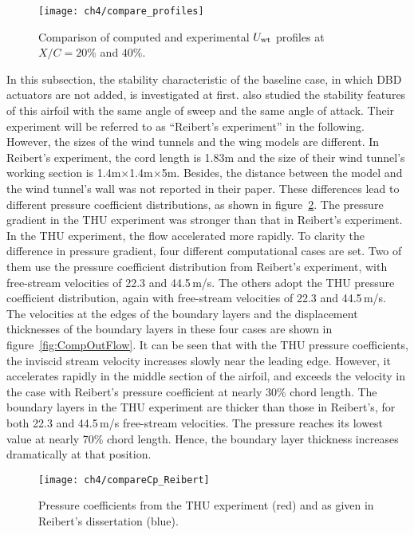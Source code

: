 \begin{figure}
\centering
  \texttt{[image: ch4/compare\_profiles]}
\caption{Comparison of computed and experimental $U_{\rm{wt}}$ profiles at  $X/C= 20\%$ and $40\%$.}
\label{f:compare_profiles}
\end{figure}
In this subsection, the stability characteristic of the baseline case, in which DBD actuators are not added, is investigated at first.  \cite{Reiberit1996} also studied the stability features of this airfoil with the same  angle of sweep and the same angle of attack. Their experiment will be referred to as ``Reibert's experiment'' in the following. However, the sizes of the wind tunnels and the wing models are  different. In Reibert's experiment, the cord length is 1.83m and the size of their wind tunnel's working section is 1.4m$\times$1.4m$\times$5m. Besides, the distance between the model and the wind tunnel's wall was not reported in their paper. These differences lead to different pressure coefficient distributions, as shown in figure~\ref{f:CpCompare}. The pressure gradient in the THU experiment was stronger than that in Reibert's experiment. In the THU experiment, the flow accelerated more rapidly. To clarity the difference in pressure gradient, four different computational cases are set. Two of them use the pressure coefficient distribution from Reibert's experiment, with free-stream velocities of 22.3 and 44.5\,m/s. The others adopt the THU pressure coefficient distribution, again with free-stream velocities of 22.3 and 44.5\,m/s. The velocities at the edges of the boundary layers and the displacement thicknesses of the boundary layers in these four cases are shown in figure~\ref{fig:CompOutFlow}. It can be seen that with the THU pressure coefficients, the inviscid stream velocity increases slowly near the leading edge. However, it accelerates rapidly in the middle section of the airfoil, and exceeds the velocity in the case with Reibert's pressure coefficient at nearly 30\% chord length. The boundary layers in the THU experiment are thicker than those in Reibert's, for both  22.3 and 44.5\,m/s free-stream velocities. The pressure reaches its lowest value at nearly 70\% chord length. Hence, the boundary layer thickness increases dramatically at that position.
\begin{figure}
\centering
  \texttt{[image: ch4/compareCp\_Reibert]}
  \caption{Pressure coefficients from the THU experiment (red) and as given in Reibert's dissertation \cite{Reiberit1996} (blue).}\label{f:CpCompare}
\end{figure}
